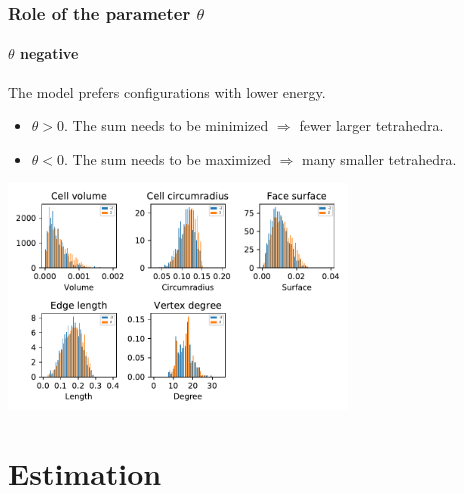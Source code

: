 \documentclass[c, 10pt]{beamer}
\begin{document}
\begin{frame}\frametitle{Role of the parameter $\theta$}\framesubtitle{$\theta$ negative}
\begin{small}
The model prefers configurations with lower energy.
\begin{itemize}
\item $\theta >0$. The sum needs to be minimized $\Rightarrow$ fewer larger tetrahedra. 
\item $\theta <0$. The sum needs to be maximized $\Rightarrow$ many smaller tetrahedra. 
\end{itemize}
\end{small}

\begin{center}
\includegraphics[height = 6cm]{./FigureLayout/facets_neg.pdf}
\end{center}


\end{frame}


\section{Estimation}
\framesection{}
\end{document}
